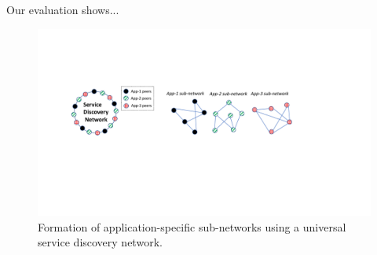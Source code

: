 Our evaluation shows...


\begin{figure}
    \includegraphics[width=1\linewidth]{img/subnetwork}
    \caption{Formation of application-specific sub-networks using a universal service discovery network.}
    \label{fig:subnetwork}
\end{figure}











